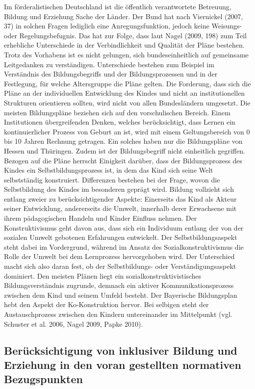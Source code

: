 Im förderalistischen Deutschland ist die öffentlich verantwortete Betreuung, Bildung und Erziehung Sache der Länder. Der Bund hat nach Viernickel (2007, 37) in solchen Fragen lediglich eine Anregungsfunktion, jedoch keine Weisungs- oder Regelungsbefugnis. Das hat zur Folge, dass laut Nagel (2009, 198) zum Teil erhebliche Unterschiede in der Verbindlichkeit und Qualität der Pläne bestehen. Trotz des Vorhabens ist es nicht gelungen, sich bundeseinheitlich auf gemeinsame Leitgedanken zu verständigen. Unterschiede bestehen zum Beispiel im Verständnis des Bildungsbegriffs und der Bildungsprozessen und in der Festlegung, für welche Altersgruppe die Pläne gelten. Die Forderung, dass sich die Pläne an der individuellen Entwicklung des Kindes und nicht an institutionellen Strukturen orientieren sollten, wird nicht von allen Bundesländern umgesetzt. Die meisten Bildungspläne beziehen sich auf den vorschulischen Bereich. Einem Institutionen übergreifenden Denken, welches berücksichtigt, dass Lernen ein kontinuierlicher Prozess von Geburt an ist, wird mit einem Geltungsbereich von 0 bis 10 Jahren Rechnung getragen. Ein solches haben nur die Bildungspläne von Hessen und Thüringen.  
Zudem ist der Bildungsbegriff nicht einheitlich gegriffen. Bezogen auf die Pläne herrscht Einigkeit darüber, dass der Bildungsprozess des Kindes ein Selbstbildungsprozess ist, in dem das Kind sich seine Welt selbstständig konstruiert. Differenzen bestehen bei der Frage, wovon die Selbstbildung des Kindes im besonderen geprägt wird. Bildung vollzieht sich entlang zweier zu berücksichtigender Aspekte: Einerseits das Kind als Akteur seiner Entwicklung, andererseits die Umwelt, innerhalb derer Erwachsene mit ihrem pädagogischen Handeln und Kinder Einfluss nehmen. Der Konstruktivismus geht davon aus, dass sich ein Individuum entlang der von der sozialen Umwelt gebotenen Erfahrungen entwickelt. Der Selbstbildungsaspekt steht dabei im Vordergrund, während im Ansatz des Sozialkonstruktivismus die Rolle der Umwelt bei dem Lernprozess hervorgehoben wird. Der Unterschied macht sich also daran fest, ob der Selbstbildungs- oder Verständigungsaspekt dominiert. Den meisten Plänen liegt ein sozialkonstruktivistisches Bildungsverständnis zugrunde, demnach ein aktiver Kommunikationsprozess zwischen dem Kind und seinem Umfeld besteht. Der Bayerische Bildungsplan hebt den Aspekt der Ko-Konstruktion hervor. Bei selbigen steht der Austauschprozess zwischen den Kindern untereinander im Mittelpunkt (vgl. Schuster et al. 2006, Nagel 2009, Papke 2010).

\subsection{Berücksichtigung von inklusiver Bildung und Erziehung in den voran gestellten normativen Bezugspunkten}\label{kap:beruecksichtigung}

